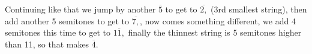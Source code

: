 \documentclass[preview]{standalone}
\begin{document}
\begin{center}
Continuing like that we jump by another $\overline{5}$ to get to $\overline{2,}$ (3rd smallest string), then add another 5 semitones to get to $\overline{7,}$, now comes something different, we add 4 semitones this time to get to $\overline{11,}$ finally the thinnest string is 5 semitones higher than 11, so that makes $\overline{4}$.
\end{center}
\end{document}

